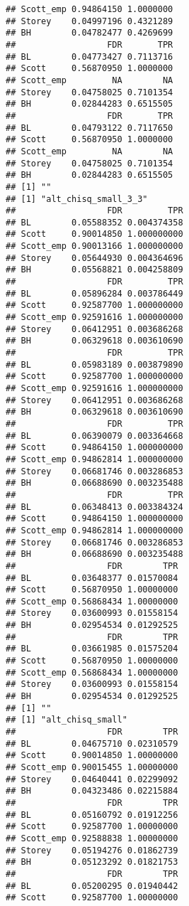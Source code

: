 \documentclass{article}\usepackage[]{graphicx}\usepackage[]{color}
\makeatletter
\newenvironment{kframe}{%
 \def\at@end@of@kframe{}%
 \ifinner\ifhmode%
  \def\at@end@of@kframe{\end{minipage}}%
  \begin{minipage}{\columnwidth}%
 \fi\fi%
 \def\FrameCommand##1{\hskip\@totalleftmargin \hskip-\fboxsep
 \colorbox{shadecolor}{##1}\hskip-\fboxsep
     \hskip-\linewidth \hskip-\@totalleftmargin \hskip\columnwidth}%
 \MakeFramed {\advance\hsize-\width
   \@totalleftmargin\z@ \linewidth\hsize
   \@setminipage}}%
 {\par\unskip\endMakeFramed%
 \at@end@of@kframe}
\newenvironment{knitrout}{}{} %
\makeatother
\begin{document}
\begin{knitrout}
\begin{kframe}
\begin{verbatim}
## Scott_emp 0.94864150 1.0000000
## Storey    0.04997196 0.4321289
## BH        0.04782477 0.4269699
##                  FDR       TPR
## BL        0.04773427 0.7113716
## Scott     0.56870950 1.0000000
## Scott_emp         NA        NA
## Storey    0.04758025 0.7101354
## BH        0.02844283 0.6515505
##                  FDR       TPR
## BL        0.04793122 0.7117650
## Scott     0.56870950 1.0000000
## Scott_emp         NA        NA
## Storey    0.04758025 0.7101354
## BH        0.02844283 0.6515505
## [1] ""
## [1] "alt_chisq_small_3_3"
##                  FDR         TPR
## BL        0.05588352 0.004374358
## Scott     0.90014850 1.000000000
## Scott_emp 0.90013166 1.000000000
## Storey    0.05644930 0.004364696
## BH        0.05568821 0.004258809
##                  FDR         TPR
## BL        0.05896284 0.003786449
## Scott     0.92587700 1.000000000
## Scott_emp 0.92591616 1.000000000
## Storey    0.06412951 0.003686268
## BH        0.06329618 0.003610690
##                  FDR         TPR
## BL        0.05983189 0.003879890
## Scott     0.92587700 1.000000000
## Scott_emp 0.92591616 1.000000000
## Storey    0.06412951 0.003686268
## BH        0.06329618 0.003610690
##                  FDR         TPR
## BL        0.06390079 0.003364668
## Scott     0.94864150 1.000000000
## Scott_emp 0.94862814 1.000000000
## Storey    0.06681746 0.003286853
## BH        0.06688690 0.003235488
##                  FDR         TPR
## BL        0.06348413 0.003384324
## Scott     0.94864150 1.000000000
## Scott_emp 0.94862814 1.000000000
## Storey    0.06681746 0.003286853
## BH        0.06688690 0.003235488
##                  FDR        TPR
## BL        0.03648377 0.01570084
## Scott     0.56870950 1.00000000
## Scott_emp 0.56868434 1.00000000
## Storey    0.03600993 0.01558154
## BH        0.02954534 0.01292525
##                  FDR        TPR
## BL        0.03661985 0.01575204
## Scott     0.56870950 1.00000000
## Scott_emp 0.56868434 1.00000000
## Storey    0.03600993 0.01558154
## BH        0.02954534 0.01292525
## [1] ""
## [1] "alt_chisq_small"
##                  FDR        TPR
## BL        0.04675710 0.02310579
## Scott     0.90014850 1.00000000
## Scott_emp 0.90015455 1.00000000
## Storey    0.04640441 0.02299092
## BH        0.04323486 0.02215884
##                  FDR        TPR
## BL        0.05160792 0.01912256
## Scott     0.92587700 1.00000000
## Scott_emp 0.92588838 1.00000000
## Storey    0.05194276 0.01862739
## BH        0.05123292 0.01821753
##                  FDR        TPR
## BL        0.05200295 0.01940442
## Scott     0.92587700 1.00000000

\end{verbatim}
\end{kframe}
\end{knitrout}
\end{document}

